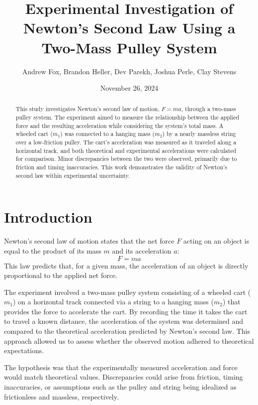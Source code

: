 \documentclass[12pt,twocolumn]{article}
\title{Experimental Investigation of Newton's Second Law Using a Two-Mass Pulley System}
\author{Andrew Fox, Brandon Heller, Dev Parekh, Joshua Perle, Clay Stevens}
\date{November 26, 2024}
\begin{document}
\maketitle

\begin{abstract}
This study investigates Newton’s second law of motion, \( F = ma \), through a two-mass pulley system. The experiment aimed to measure the relationship between the applied force and the resulting acceleration while considering the system's total mass. A wheeled cart (\( m_1 \)) was connected to a hanging mass (\( m_2 \)) by a nearly massless string over a low-friction pulley. The cart’s acceleration was measured as it traveled along a horizontal track, and both theoretical and experimental accelerations were calculated for comparison. Minor discrepancies between the two were observed, primarily due to friction and timing inaccuracies. This work demonstrates the validity of Newton’s second law within experimental uncertainty.
\end{abstract}

\section*{Introduction}
Newton’s second law of motion states that the net force \( F \) acting on an object is equal to the product of its mass \( m \) and its acceleration \( a \):
\begin{equation}
F = ma
\end{equation}
This law predicts that, for a given mass, the acceleration of an object is directly proportional to the applied net force. 

The experiment involved a two-mass pulley system consisting of a wheeled cart (\( m_1 \)) on a horizontal track connected via a string to a hanging mass (\( m_2 \)) that provides the force to accelerate the cart. By recording the time it takes the cart to travel a known distance, the acceleration of the system was determined and compared to the theoretical acceleration predicted by Newton's second law. This approach allowed us to assess whether the observed motion adhered to theoretical expectations.

The hypothesis was that the experimentally measured acceleration and force would match theoretical values. Discrepancies could arise from friction, timing inaccuracies, or assumptions such as the pulley and string being idealized as frictionless and massless, respectively.
\end{document}
